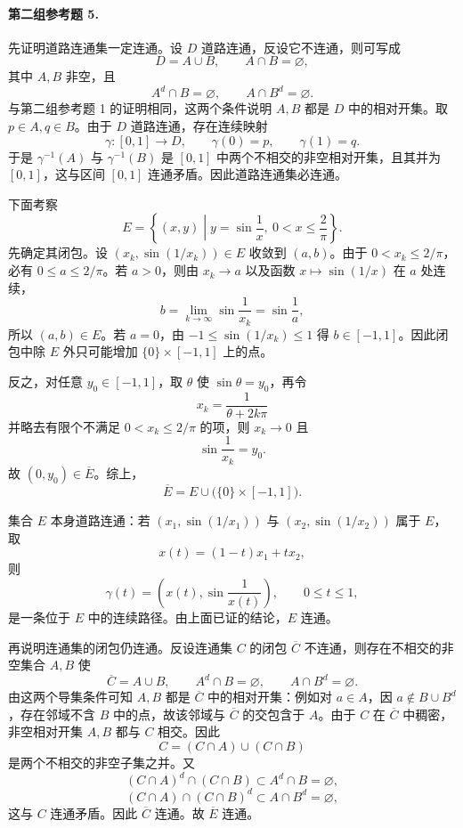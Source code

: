 \paragraph{第二组参考题 5.}
\begin{xsolution}
先证明道路连通集一定连通。设 $D$ 道路连通，反设它不连通，则可写成
\[
  D=A\cup B,
  \qquad A\cap B=\varnothing,
\]
其中 $A,B$ 非空，且
\[
  A^d\cap B=\varnothing,
  \qquad
  A\cap B^d=\varnothing.
\]
与第二组参考题 1 的证明相同，这两个条件说明 $A,B$ 都是 $D$ 中的相对开集。取 $p\in A,q\in B$。由于 $D$ 道路连通，存在连续映射
\[
  \gamma\colon[0,1]\to D,
  \qquad \gamma(0)=p,
  \qquad \gamma(1)=q.
\]
于是 $\gamma^{-1}(A)$ 与 $\gamma^{-1}(B)$ 是 $[0,1]$ 中两个不相交的非空相对开集，且其并为 $[0,1]$，这与区间 $[0,1]$ 连通矛盾。因此道路连通集必连通。

下面考察
\[
  E=\left\{(x,y)\middle|y=\sin\frac1x,\ 0<x\leq\frac2\pi\right\}.
\]
先确定其闭包。设 $(x_k,\sin(1/x_k))\in E$ 收敛到 $(a,b)$。由于 $0<x_k\leq2/\pi$，必有 $0\leq a\leq2/\pi$。若 $a>0$，则由 $x_k\to a$ 以及函数 $x\mapsto\sin(1/x)$ 在 $a$ 处连续，
\[
  b=\lim_{k\to\infty}\sin\frac1{x_k}=\sin\frac1a,
\]
所以 $(a,b)\in E$。若 $a=0$，由 $-1\leq\sin(1/x_k)\leq1$ 得 $b\in[-1,1]$。因此闭包中除 $E$ 外只可能增加 $\{0\}\times[-1,1]$ 上的点。

反之，对任意 $y_0\in[-1,1]$，取 $\theta$ 使 $\sin\theta=y_0$，再令
\[
  x_k=\frac1{\theta+2k\pi}
\]
并略去有限个不满足 $0<x_k\leq2/\pi$ 的项，则 $x_k\to0$ 且
\[
  \sin\frac1{x_k}=y_0.
\]
故 $(0,y_0)\in\overline E$。综上，
\[
  \overline E
  =E\cup\bigl(\{0\}\times[-1,1]\bigr).
\]

集合 $E$ 本身道路连通：若 $(x_1,\sin(1/x_1))$ 与 $(x_2,\sin(1/x_2))$ 属于 $E$，取
\[
  x(t)=(1-t)x_1+tx_2,
\]
则
\[
  \gamma(t)=\left(x(t),\sin\frac1{x(t)}\right),\qquad 0\leq t\leq1,
\]
是一条位于 $E$ 中的连续路径。由上面已证的结论，$E$ 连通。

再说明连通集的闭包仍连通。反设连通集 $C$ 的闭包 $\overline C$ 不连通，则存在不相交的非空集合 $A,B$ 使
\[
  \overline C=A\cup B,
  \qquad A^d\cap B=\varnothing,
  \qquad A\cap B^d=\varnothing.
\]
由这两个导集条件可知 $A,B$ 都是 $\overline C$ 中的相对开集：例如对 $a\in A$，因 $a\notin B\cup B^d$，存在邻域不含 $B$ 中的点，故该邻域与 $\overline C$ 的交包含于 $A$。由于 $C$ 在 $\overline C$ 中稠密，非空相对开集 $A,B$ 都与 $C$ 相交。因此
\[
  C=(C\cap A)\cup(C\cap B)
\]
是两个不相交的非空子集之并。又
\[
  (C\cap A)^d\cap(C\cap B)\subset A^d\cap B=\varnothing,
\]
\[
  (C\cap A)\cap(C\cap B)^d\subset A\cap B^d=\varnothing,
\]
这与 $C$ 连通矛盾。因此 $\overline C$ 连通。故 $\overline E$ 连通。


\end{xsolution}
